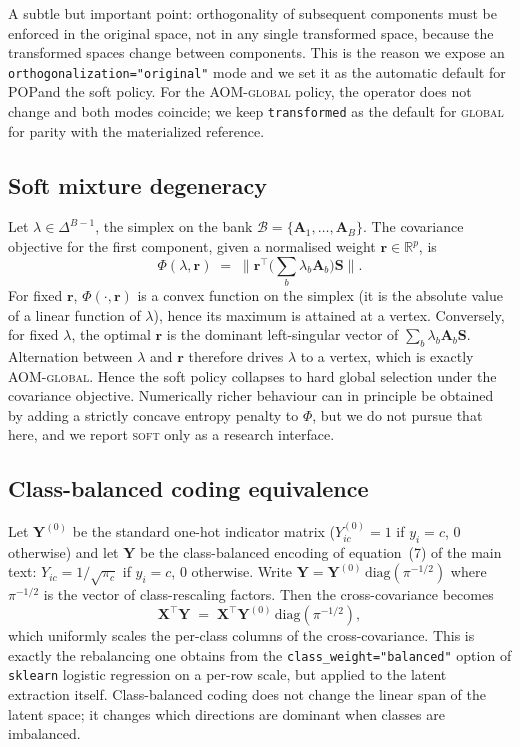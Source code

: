 \documentclass[a4paper,11pt]{article}
\newcommand{\R}{\mathbb{R}}
\newcommand{\diag}{\mathrm{diag}}
\newcommand{\Xmat}{\mathbf{X}}
\newcommand{\Ymat}{\mathbf{Y}}
\newcommand{\Amat}{\mathbf{A}}
\newcommand{\Smat}{\mathbf{S}}
\newcommand{\rvec}{\mathbf{r}}
\newcommand{\AOM}{\textsc{AOM}}
\newcommand{\POP}{\textsc{POP}}
\begin{document}
A subtle but important point: orthogonality of subsequent components
must be enforced in the original space, not in any single transformed
space, because the transformed spaces change between components. This
is the reason we expose an \texttt{orthogonalization="original"} mode
and we set it as the automatic default for \POP and the soft policy.
For the \AOM-\textsc{global} policy, the operator does not change and
both modes coincide; we keep \texttt{transformed} as the default for
\textsc{global} for parity with the materialized reference.

\subsection{Soft mixture degeneracy}\label{app:soft}
Let $\lambda\in\Delta^{B-1}$, the simplex on the bank
$\mathcal{B}=\{\Amat_1,\dots,\Amat_B\}$. The covariance objective for
the first component, given a normalised weight $\rvec\in\R^p$, is
\[
\Phi(\lambda,\rvec)
\;=\;\Big\|\rvec^\top \Big(\sum_b \lambda_b \Amat_b\Big) \Smat\Big\|.
\]
For fixed $\rvec$, $\Phi(\cdot,\rvec)$ is a convex function on the
simplex (it is the absolute value of a linear function of $\lambda$),
hence its maximum is attained at a vertex. Conversely, for fixed
$\lambda$, the optimal $\rvec$ is the dominant left-singular vector of
$\sum_b \lambda_b \Amat_b\Smat$. Alternation between $\lambda$ and
$\rvec$ therefore drives $\lambda$ to a vertex, which is exactly
\AOM-\textsc{global}. Hence the soft policy collapses to hard global
selection under the covariance objective. Numerically richer behaviour
can in principle be obtained by adding a strictly concave entropy
penalty to $\Phi$, but we do not pursue that here, and we report
\textsc{soft} only as a research interface.

\subsection{Class-balanced coding equivalence}\label{app:plsda-coding}
Let $\Ymat^{(0)}$ be the standard one-hot indicator matrix
($Y^{(0)}_{ic}=1$ if $y_i=c$, $0$ otherwise) and let $\Ymat$ be the
class-balanced encoding of equation~(7) of the main text:
$Y_{ic}=1/\sqrt{\pi_c}$ if $y_i=c$, $0$ otherwise. Write
$\Ymat=\Ymat^{(0)}\,\diag(\pi^{-1/2})$ where $\pi^{-1/2}$ is the vector
of class-rescaling factors. Then the cross-covariance becomes
\[
\Xmat^\top \Ymat
\;=\; \Xmat^\top \Ymat^{(0)}\,\diag(\pi^{-1/2}),
\]
which uniformly scales the per-class columns of the cross-covariance.
This is exactly the rebalancing one obtains from the
\verb|class_weight="balanced"| option of \texttt{sklearn} logistic
regression on a per-row scale, but applied to the latent extraction
itself. Class-balanced coding does not change the linear span of the
latent space; it changes which directions are dominant when classes
are imbalanced.
\end{document}
